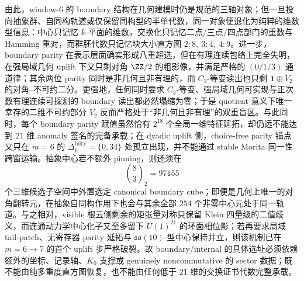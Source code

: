 \noindent
由此，window-\(6\) 的 boundary 结构在几何建模时仍是规范的三轴对象；但一旦投向抽象群、自同构轨道或仅保留同构型的半单代数，同一对象便退化为纯粹的维数型信息：中心只记忆 \(k\)-平面的维数，交换化只记忆二点/三点/四点部门的重数与 Hamming 重对，而群胚代数只记忆块大小直方图 \(2:8,\ 3:4,\ 4:9\)。进一步，boundary parity 在表示层面确实形成八重超选，但在有理连续包络上完全失明，在强局域几何 uplift 下又只剩对角 \(\ZZ/2\) 的粗影像，并满足严格的 \((0/1/3)\) 通道律；其余两位 parity 同时是非几何且非有理的，而 \(C_3\)-等变读出也只剩 \(\mathbf 1\oplus V_2\) 的对角--不可约二分。更强地，任何同时要求 \(C_3\)-等变、强局域几何可实现与正次数有理连续可探测的 boundary 读出都必然塌缩为零；于是 quotient 意义下唯一幸存的二维不可约部分 \(V_2\) 反而严格处于“非几何且非有理”的双重盲区。与此同时，每个 boundary parity 赋值虽然恰有 \(2^{18}\) 个全局一维特征延拓，却仍远不能达到 \(21\) 维 anomaly 签名的完备承载；在 dyadic uplift 侧，choice-free parity 锚点又只在 \(m=6\) 的 \(\Delta_6^{\mathrm{bdry}}=\{0,34\}\) 处孤立出现，并不能通过 stable Morita 同一性跨窗运输。抽象中心若不额外 pinning，则还须在
\[
\binom{8}{3}_2=97155
\]
个三维候选子空间中外置选定 canonical boundary cube；即便是几何上唯一的对角翻转元，在抽象自同构作用下也会与其余全部 \(254\) 个非零中心元处于同一轨道。与之相对，visible 根云侧剩余的矩张量对称只保留 Klein 四量级的二值歧义，而连通动力学中心化子又至多留下 \(U(1)^{21}\) 的环面相位影；若再要求局域 tail-patch、无寄存器 parity 延拓与 \(\mathfrak{so}(10)\)-型中心保持并立，则该机制已在 \(m=6\to 7\) 的首个 uplift 步严格破裂。故 boundary/internal 的具体选址必须依赖额外的坐标、记录轴、\(K_0\) 支撑或 genuinely noncommutative 的 sector 数据；既不能由纯多重度直方图恢复，也不能由任何低于 \(21\) 维的交换证书代数完整承载。

\endinput
